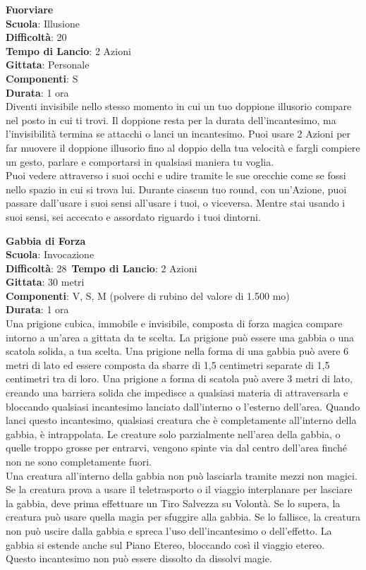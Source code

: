 \begin{multicols}{2}
\medskip\textbf{Fuorviare}\\
\textbf{Scuola}: Illusione\\
\textbf{Difficoltà}:  20\\
\textbf{Tempo di Lancio}: 2 Azioni\\
\textbf{Gittata}: Personale\\
\textbf{Componenti}: S\\
\textbf{Durata}: 1 ora\\
Diventi invisibile nello stesso momento in cui un tuo doppione illusorio compare nel posto in cui ti trovi. Il doppione resta per la durata dell'incantesimo, ma l’invisibilità termina se attacchi o lanci un incantesimo. Puoi usare 2 Azioni per far muovere il doppione illusorio fino al doppio della tua velocità e fargli compiere un gesto, parlare e comportarsi in qualsiasi maniera tu voglia.\\
Puoi vedere attraverso i suoi occhi e udire tramite le sue orecchie come se fossi nello spazio in cui si trova lui. Durante ciascun tuo round, con un'Azione, puoi passare dall'usare i suoi sensi all'usare i tuoi, o viceversa. Mentre stai usando i suoi sensi, sei accecato e assordato riguardo i tuoi dintorni. 

\medskip\textbf{Gabbia di Forza}\\
\textbf{Scuola}: Invocazione\\
\textbf{Difficoltà}: 28\
\textbf{Tempo di Lancio}: 2 Azioni\\
\textbf{Gittata}: 30 metri\\
\textbf{Componenti}: V, S, M (polvere di rubino del valore di 1.500 mo)\\
\textbf{Durata}: 1 ora\\
Una prigione cubica, immobile e invisibile, composta di forza magica compare intorno a un'area a gittata da te scelta. La prigione può essere una gabbia o una scatola solida, a tua scelta. Una prigione nella forma di una gabbia può avere 6 metri di lato ed essere composta da sbarre di 1,5 centimetri separate di 1,5 centimetri tra di loro. Una prigione a forma di scatola può avere 3 metri di lato, creando una barriera solida che impedisce a qualsiasi materia di attraversarla e bloccando qualsiasi incantesimo lanciato dall'interno o l’esterno dell'area. Quando lanci questo incantesimo, qualsiasi creatura che è completamente all'interno della gabbia, è intrappolata. Le creature solo parzialmente nell'area della gabbia, o quelle troppo grosse per entrarvi, vengono spinte via dal centro dell'area finché non ne sono completamente fuori.\\
Una creatura all'interno della gabbia non può lasciarla tramite mezzi non magici. Se la creatura prova a usare il teletrasporto o il viaggio interplanare per lasciare la gabbia, deve prima effettuare un Tiro Salvezza su Volontà. Se lo supera, la creatura può usare quella magia per sfuggire alla gabbia. Se lo fallisce, la creatura non può uscire dalla gabbia e spreca l’uso dell'incantesimo o dell'effetto. La gabbia si estende anche sul Piano Etereo, bloccando così il viaggio etereo.\\
Questo incantesimo non può essere dissolto da dissolvi magie.


\end{multicols}
